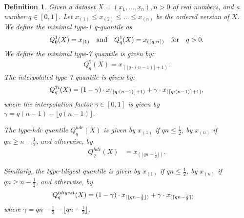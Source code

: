\documentclass{article}
\DeclarePairedDelimiter{\ceil}{\lceil}{\rceil}
\theoremstyle{plain}
\newtheorem{definition}{Definition}[section]
\theoremstyle{remark}
\newcommand{\qtext}[1]{\quad\text{#1}\quad} %
\newcommand{\floor}[1]{\lfloor#1\rfloor}
\begin{document}
\begin{definition} \label{def:quantiles}
  Given a dataset $X=(x_1,\dots,x_n), n>0$ of real numbers, and a number $q \in [0,1]$.
  Let $x_{(1)} \leq x_{(2)} \leq \dots \leq x_{(n)}$ be the ordered version of $X$.
  We define the minimal type-1 q-quantile as
  \begin{align*}
    Q^1_0(X) = x_{(1)} \qtext{and}  Q^1_q(X) = x_{(\ceil{q \cdot n})} \qtext{for} q > 0.
  \end{align*}
  We define the minimal type-7 quantile is given by:
  \begin{align*}
    Q^{7}_q(X) = x_{(\floor{q \cdot (n - 1)} + 1)}.
  \end{align*}
  The interpolated type-7 quantile is given by:
  \begin{align*}
    Q^{7i}_q(X) = (1 - \gamma) \cdot x_{(\floor{q \cdot (n - 1)} + 1)} + \gamma \cdot x_{(\ceil{q \cdot (n - 1)} + 1)},
  \end{align*}
  where the interpolation factor $\gamma \in [0,1]$ is given by $\gamma = q(n-1) - \floor{q(n-1)}$.

  The type-hdr quantile $Q^{hdr}_q(X)$ is given by $x_{(1)}$ if $qn \leq \frac{1}{2}$, by $x_{(n)}$
  if $qn \geq n - \frac{1}{2}$, and otherwise, by
  \begin{align*}
    Q^{hdr}_q(X) &= x_{(\floor{q n - \frac{1}{2}})}.
  \end{align*}

  Similarly, the type-tdigest quantile is given by $x_{(1)}$ if $qn \leq \frac{1}{2}$, by $x_{(n)}$
  if $qn \geq n - \frac{1}{2}$, and otherwise, by
  \begin{align*}
    Q^{tdigest}_q(X) &= (1 - \gamma) \cdot x_{(\floor{q n - \frac{1}{2}})} + \gamma \cdot x_{(\ceil{q n - \frac{1}{2}})}
  \end{align*}
  where $\gamma = q n - \frac{1}{2} - \floor{q n - \frac{1}{2}}$.
\end{definition}
\end{document}
